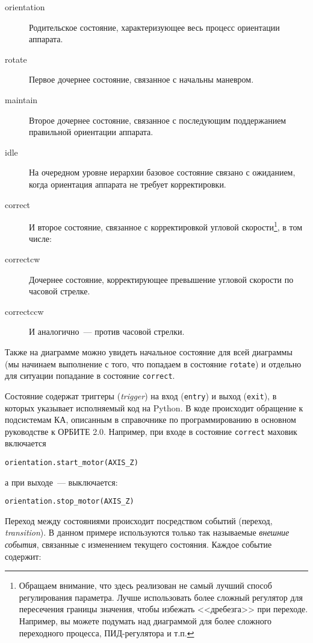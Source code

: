 \documentclass[12pt,a4paper]{article}
\begin{document}
\begin{description}
\item[orientation] Родительское состояние, характеризующее весь процесс ориентации
  аппарата.
\item[rotate] Первое дочернее состояние, связанное с начальны маневром.
\item[maintain] Второе дочернее состояние, связанное с последующим поддержанием правильной
  ориентации аппарата.
\item[idle] На очередном уровне иерархии базовое состояние связано с ожиданием, когда
  ориентация аппарата не требует корректировки.
\item[correct] И второе состояние, связанное с корректировкой угловой
  скорости\footnote{Обращаем внимание, что здесь реализован не самый лучший способ
    регулирования параметра. Лучше использовать более сложный регулятор для пересечения
    границы значения, чтобы избежать <<дребезга>> при переходе. Например, вы можете подумать
    над диаграммой для более сложного переходного процесса, ПИД-регулятора и т.п.}, в том числе:
\item[correct\textunderscore cw] Дочернее состояние, корректирующее превышение угловой
  скорости по часовой стрелке.
\item[correct\textunderscore ccw] И аналогично~--- против часовой стрелки. 
\end{description}

Также на диаграмме можно увидеть начальное состояние для всей диаграммы (мы начинаем
выполнение с того, что попадаем в состояние \verb'rotate') и отдельно для ситуации
попадание в состояние \verb'correct'.

Состояние содержат триггеры (\emph{trigger}) на вход (\verb'entry') и выход (\verb'exit'), в которых
указывает исполняемый код на Python. В коде происходит обращение к подсистемам КА,
описанным в справочнике по программированию в основном руководстве к ОРБИТЕ 2.0. Например,
при входе в состояние  \verb'correct' маховик включается

\begin{verbatim}
orientation.start_motor(AXIS_Z)
\end{verbatim}

а при выходе~--- выключается:

\begin{verbatim}
orientation.stop_motor(AXIS_Z)
\end{verbatim}

Переход между состояниями происходит посредством событий (переход, \emph{transition}). В
данном примере используются только так называемые \emph{внешние события}, связанные с
изменением текущего состояния. Каждое событие содержит:
\end{document}
